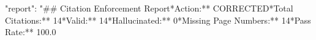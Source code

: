 {{{      "report": "## Citation Enforcement Report\n\n**Action:** CORRECTED\n**Total Citations:** 14\n**Valid:** 14\n**Hallucinated:** 0\n**Missing Page Numbers:** 14\n**Pass Rate:** 100.0%
}}}
